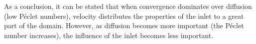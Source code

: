 As a conclusion, it can be stated that when convergence dominates over diffusion (low Péclet numbers), velocity distributes the properties of the inlet to a great part of the domain. However, as diffusion becomes more important (the Péclet number increases), the influence of the inlet becomes less important.